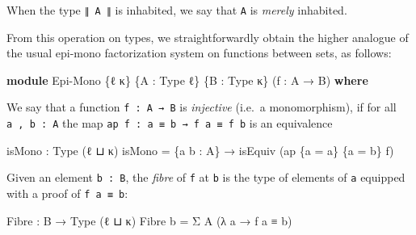 \documentclass[
  11pt,
  oneside,
  article]{memoir}
\newenvironment{Shaded}{}{}
\newcommand{\KeywordTok}[1]{\textcolor[rgb]{0.00,0.44,0.13}{\textbf{#1}}}
\newcommand{\NormalTok}[1]{#1}
\newcommand{\OtherTok}[1]{\textcolor[rgb]{0.00,0.44,0.13}{#1}}
\theoremstyle{definition}
\theoremstyle{plain}
\newcommand{\0}{\textsf{0}}
\newcommand{\1}{\tn{\textsf{1}}}
\begin{document}
When the type \texttt{∥\ A\ ∥} is inhabited, we say that \texttt{A} is
\emph{merely} inhabited.

From this operation on types, we straightforwardly obtain the higher
analogue of the usual epi-mono factorization system on functions between
sets, as follows:

\begin{Shaded}
\begin{Highlighting}[]
\KeywordTok{module}\NormalTok{ Epi{-}Mono }\OtherTok{\{}\NormalTok{ℓ κ}\OtherTok{\}} \OtherTok{\{}\NormalTok{A }\OtherTok{:}\NormalTok{ Type ℓ}\OtherTok{\}} \OtherTok{\{}\NormalTok{B }\OtherTok{:}\NormalTok{ Type κ}\OtherTok{\}} \OtherTok{(}\NormalTok{f }\OtherTok{:}\NormalTok{ A }\OtherTok{→}\NormalTok{ B}\OtherTok{)} \KeywordTok{where}
\end{Highlighting}
\end{Shaded}

We say that a function \texttt{f\ :\ A\ →\ B} is \emph{injective}
(i.e.~a monomorphism), if for all \texttt{a\ ,\ b\ :\ A} the map
\texttt{ap\ f\ :\ a\ ≡\ b\ →\ f\ a\ ≡\ f\ b} is an equivalence

\begin{Shaded}
\begin{Highlighting}[]
\NormalTok{    isMono }\OtherTok{:}\NormalTok{ Type }\OtherTok{(}\NormalTok{ℓ ⊔ κ}\OtherTok{)}
\NormalTok{    isMono }\OtherTok{=} \OtherTok{\{}\NormalTok{a b }\OtherTok{:}\NormalTok{ A}\OtherTok{\}} \OtherTok{→}\NormalTok{ isEquiv }\OtherTok{(}\NormalTok{ap }\OtherTok{\{}\NormalTok{a }\OtherTok{=}\NormalTok{ a}\OtherTok{\}} \OtherTok{\{}\NormalTok{a\textquotesingle{} }\OtherTok{=}\NormalTok{ b}\OtherTok{\}}\NormalTok{ f}\OtherTok{)}
\end{Highlighting}
\end{Shaded}

Given an element \texttt{b\ :\ B}, the \emph{fibre} of \texttt{f} at
\texttt{b} is the type of elements of \texttt{a} equipped with a proof
of \texttt{f\ a\ ≡\ b}:

\begin{Shaded}
\begin{Highlighting}[]
\NormalTok{    Fibre }\OtherTok{:}\NormalTok{ B }\OtherTok{→}\NormalTok{ Type }\OtherTok{(}\NormalTok{ℓ ⊔ κ}\OtherTok{)}
\NormalTok{    Fibre b }\OtherTok{=}\NormalTok{ Σ A }\OtherTok{(λ}\NormalTok{ a }\OtherTok{→}\NormalTok{ f a ≡ b}\OtherTok{)}
\end{Highlighting}
\end{Shaded}
\end{document}
